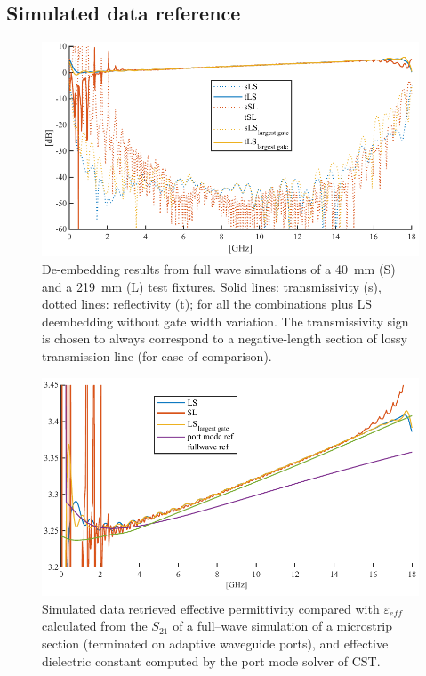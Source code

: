 \documentclass[11pt,a4paper]{article}
\begin{document}
    \subsection{Simulated data reference}
    \label{subsec:simulation}
    \begin{figure}[!h]
        \includegraphics[width=\textwidth]{sparasim}
        \caption{De-embedding results from full wave simulations of a 40~mm (S) and a 219~mm (L) test fixtures.
        Solid lines: transmissivity (s), dotted lines: reflectivity (t); for all the combinations plus LS deembedding
        without gate width variation. The transmissivity sign is chosen to always correspond to a negative-length section
        of lossy transmission line (for ease of comparison).}
        \label{fig:sparasim}
    \end{figure}
    \begin{figure}[!h]
        \includegraphics[width=\textwidth]{epsisim}
        \caption{Simulated data retrieved effective permittivity compared with $\varepsilon_{eff}$ calculated from
        the $S_{21}$ of a full--wave simulation of a microstrip section (terminated on adaptive waveguide ports),
            and effective dielectric constant computed by the port mode solver of CST.}
        \label{fig:epsilonsim}
    \end{figure}
\end{document}
